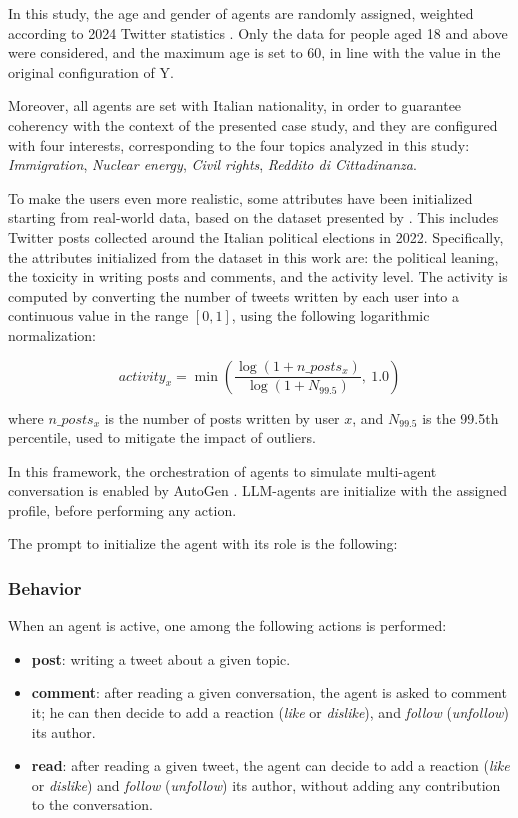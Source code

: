 \medskip
In this study, the age and gender of agents are randomly assigned, weighted according to 2024 Twitter statistics \cite{statista2024twitter}. Only the data for people aged 18 and above were considered, and the maximum age is set to 60, in line with the value in the original configuration of Y.

Moreover, all agents are set with Italian nationality, in order to guarantee coherency with the context of the presented case study, and they are configured with four interests, corresponding to the four topics analyzed in this study: \textit{Immigration}, \textit{Nuclear energy}, \textit{Civil rights}, \textit{Reddito di Cittadinanza}.

\medskip
To make the users even more realistic, some attributes have been initialized starting from real-world data, based on the dataset presented by \citet{pierri2023ita}. This includes Twitter posts collected around the Italian political elections in 2022.
Specifically, the attributes initialized from the dataset in this work are: the political leaning, the toxicity in writing posts and comments, and the activity level.
The activity is computed by converting the number of tweets written by each user into a continuous value in the range $[0,1]$, using the following logarithmic normalization:

\[
activity_x = \min\left( \frac{\log(1 + n\_posts_x)}{\log(1 + N_{99.5})},\ 1.0 \right)
\]

where $n\_posts_x$ is the number of posts written by user $x$, and $N_{99.5}$ is the 99.5th percentile, used to mitigate the impact of outliers.


\medskip
In this framework, the orchestration of agents to simulate multi-agent conversation is enabled by AutoGen \cite{pyautogen0.2.31, wu2023autogenenablingnextgenllm}.
LLM-agents are initialize with the assigned profile, before performing any action. 

The prompt to initialize the agent with its role is the following: 



\subsubsection{Behavior}
When an agent is active, one among the following actions is performed:
\begin{itemize}
    \item \textbf{post}: writing a tweet about a given topic.
    \item \textbf{comment}: after reading a given conversation, the agent is asked to comment it; he can then decide to add a reaction (\textit{like} or \textit{dislike}), and \textit{follow} (\textit{unfollow}) its author.
    \item \textbf{read}: after reading a given tweet, the agent can decide to add a reaction (\textit{like} or \textit{dislike}) and \textit{follow} (\textit{unfollow}) its author, without adding any contribution to the conversation.
\end{itemize}

